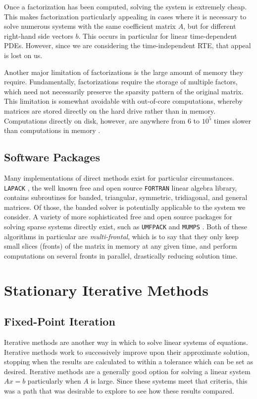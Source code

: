 \documentclass[10pt]{article}
\begin{document}
\begin{multicols}{2}
Once a factorization has been computed, solving the system is extremely cheap.
This makes factorization particularly appealing in cases where it is necessary to solve numerous systems with the same coefficient matrix $A$, but for different right-hand side vectors $b$.
This occurs in particular for linear time-dependent PDEs.
However, since we are considering the time-independent RTE, that appeal is lost on us.

Another major limitation of factorizations is the large amount of memory they require.
Fundamentally, factorizations require the storage of multiple factors, which need not necessarily preserve the sparsity pattern of the original matrix.
This limitation is somewhat avoidable with out-of-core computations, whereby matrices are stored directly on the hard drive rather than in memory.
Computations directly on disk, however, are anywhere from 6 to $10^5$ times slower than computations in memory \citep{jacobs_pathologies_2009}.

\subsection{Software Packages}
Many implementations of direct methods exist for particular circumstances.
\texttt{LAPACK} \citep{anderson_lapack_1999}, the well known free and open source \texttt{FORTRAN} linear algebra library, contains subroutines for banded, triangular, symmetric, tridiagonal, and general matrices.
Of those, the banded solver is potentially applicable to the system we consider.
A variety of more sophisticated free and open source packages for solving sparse systems directly exist, such as \texttt{UMFPACK} \citep{davis_algorithm_2004} and \texttt{MUMPS} \citep{amestoy_mumps:_2001}.
Both of these algorithms in particular are \textit{multi-frontal}, which is to say that they only keep small slices (fronts) of the matrix in memory at any given time, and perform computations on several fronts in parallel, drastically reducing solution time.

\section{Stationary Iterative Methods}
\subsection{Fixed-Point Iteration}
Iterative methods are another way in which to solve linear systems of equations.
Iterative methods work to successively improve upon their approximate solution, stopping when the results are calculated to within a tolerance which can be set as desired.
Iterative methods are a generally good option for solving a linear system $Ax=b$ particularly when $A$ is large.
Since these systems meet that criteria, this was a path that was desirable to explore to see how these results compared.



\end{multicols}
\end{document}
